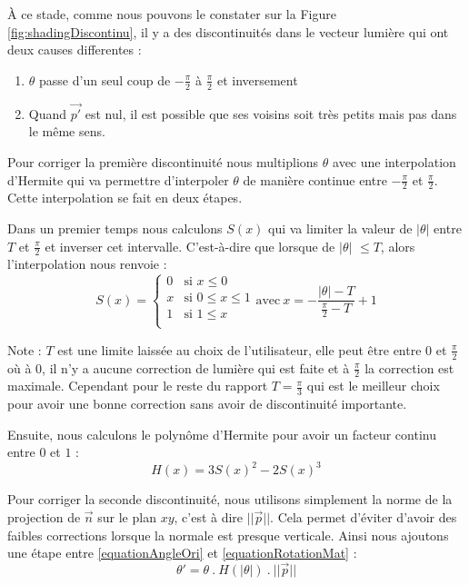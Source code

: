 À ce stade, comme nous pouvons le constater sur la Figure \ref{fig:shadingDiscontinu}, il y a des discontinuités dans le vecteur lumière qui ont deux causes differentes :
\begin{enumerate}
\item $\theta$ passe d'un seul coup de $-\frac{\pi}{2}$ à $\frac{\pi}{2}$ et inversement  
\item Quand $\vec{p'}$ est nul, il est possible que ses voisins soit très petits mais pas dans le même sens. 
\end{enumerate}

Pour corriger la première discontinuité nous multiplions $\theta$ avec une interpolation d’Hermite qui va permettre d'interpoler $\theta$ de manière continue  entre $-\frac{\pi}{2}$ et $\frac{\pi}{2}$. Cette interpolation se fait en deux étapes. 

Dans un premier temps nous calculons $S(x)$ qui va limiter la valeur de $|\theta|$ entre $T$ et $\frac{\pi}{2}$ et inverser cet intervalle. C'est-à-dire que lorsque de $|\theta|$ $\leq T$, alors l'interpolation nous renvoie :
\begin{equation}
\label{equationClamp}
S(x) = 
	\left\{
    \begin{array}{ll}
        0 & \mbox{si } x \leq 0 \\
		x & \mbox{si } 0 \leq x \leq 1 \\
        1 & \mbox{si } 1 \leq x \\
    \end{array}
\right.
\mathrm{avec} \  
x = - \frac{|\theta| - T}{\frac{\pi}{2}-T} + 1 
\end{equation}

Note : $T$ est une limite laissée au choix de l'utilisateur, elle peut être entre $0$ et $\frac{\pi}{2}$ où à $0$, il n'y a aucune correction de lumière qui est faite et à $\frac{\pi}{2}$ la correction est maximale. Cependant pour le reste du rapport $T = \frac{\pi}{3}$ qui est le meilleur choix pour avoir une bonne correction sans avoir de discontinuité importante.


Ensuite, nous calculons le polynôme d'Hermite pour avoir un facteur continu entre $0$ et $1$ : 
\begin{equation}
\label{equationHermite}
H(x) = 3S(x)^2 - 2S(x)^3 
\end{equation}

Pour corriger la seconde discontinuité, nous utilisons simplement la norme de la projection de $\vec{n}$ sur le plan $xy$, c'est à dire $||\vec{p}||$.  Cela permet d’éviter d'avoir des faibles corrections lorsque la normale est presque verticale.
Ainsi nous ajoutons une étape entre  \eqref{equationAngleOri} et \eqref{equationRotationMat} :
\begin{equation}
\theta' = \theta \ . \ H(|\theta|) \ . \ ||\vec{p} ||
\end{equation}





